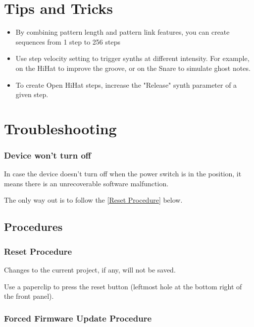 \documentclass[8pt]{extarticle}
\newcommand{\reflabel}[2]{
[\hyperref[#1]{#2}]
}
\begin{document}
\begin{multicols*}{3}
\section{Tips and Tricks}

\begin{itemize}
    \item[] By combining pattern length and pattern link features, you can create sequences from 1 step to 256 steps

    \item[] Use step velocity setting to trigger synths at different intensity. For example, on the HiHat to improve the groove, or on the Snare to simulate ghost notes. 

    \item[] To create Open HiHat steps, increase the "Release" synth parameter of a given step.   
\end{itemize}

\section{Troubleshooting}

\subsubsection{Device won't turn off}

In case the device doesn't turn off when the power switch is in the  position, it means there is an unrecoverable software malfunction. 

The only way out is to follow the \reflabel{procedures:reset}{Reset Procedure} below.

\subsection{Procedures}

\subsubsection{Reset Procedure}
\label{procedures:reset}

\begin{important}
Changes to the current project, if any, will not be saved.
\end{important}

Use a paperclip to press the reset button (leftmost hole at the bottom right of the front panel).

\subsubsection{Forced Firmware Update Procedure}
\label{procedures:forced_firmware_update}


\end{multicols*}
\end{document}
